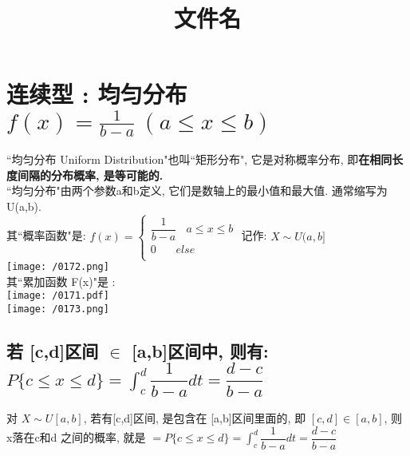 \documentclass[UTF8]{ctexart}
\title{文件名}
\begin{document}
	\tableofcontents %
	\date{} %
	\maketitle  %
	
	\section{连续型 : 均匀分布 $\boxed{f(x)=\frac{1}{b-a}\ (a\leq x\leq b)	}$ }
	
	``均匀分布 Uniform Distribution"也叫``矩形分布", 它是对称概率分布, 即\textbf{在相同长度间隔的分布概率, 是等可能的.} \\
	
	``均匀分布"由两个参数a和b定义, 它们是数轴上的最小值和最大值. 通常缩写为 U(a,b). \\
	
	其``概率函数"是: 
		$	f\left( x \right) =\left\{ \begin{array}{l}
		\dfrac{1}{b-a}\ \ \ \ a\leq x\leq b\\
		0\ \ \ \ \ \  \ \ else\\
	\end{array} \right. 	$ 
	记作: $X \sim U(a,b]$ \\
	
	\texttt{[image: /0172.png]} \\
	
	其``累加函数 F(x)"是 : \\
	\texttt{[image: /0171.pdf]} \\

	\texttt{[image: /0173.png]} \\
	
	
	
	
	
	
	\subsection{若 [c,d]区间 $\in$ [a,b]区间中, 则有: $ \boxed{
		 P\{c \leq x \leq d\} = \int_c^d \dfrac{1} {b-a} dt = \dfrac{d-c} {b-a}}$}
	
	对 $X \sim U[a,b]$, 若有[c,d]区间, 是包含在 [a,b]区间里面的, 即 $ [c,d] \in [a,b]$, 则 x落在c和d 之间的概率, 就是 $= P\{c \leq x \leq d\} = \int_c^d \dfrac{1} {b-a} dt = \dfrac{d-c} {b-a}$ \\
	
\end{document}
